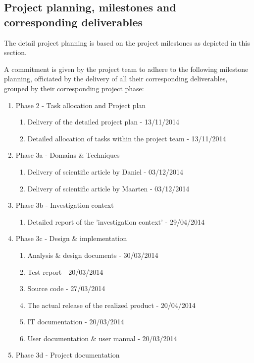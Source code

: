 \subsection{Project planning, milestones and corresponding deliverables }
The detail project planning is based on the project milestones as depicted in this section.


A commitment is given by the project team to adhere to the following milestone planning, officiated by the delivery of all their corresponding deliverables, grouped by their corresponding project phase:

 \begin{enumerate}
	\item Phase 2 - Task allocation and Project plan
 	\begin{enumerate}
		\item Delivery of the detailed project plan 			-	13/11/2014
		\item Detailed allocation of tasks within the project team 	- 	13/11/2014
	\end {enumerate}
	\item Phase 3a - Domains \& Techniques
 	\begin{enumerate}
		\item Delivery of scientific article by Daniel			- 	03/12/2014
		\item Delivery of scientific article by Maarten  			- 	03/12/2014
	\end {enumerate}
 	\item Phase 3b - Investigation context
 	\begin{enumerate}
		\item Detailed report of the 'investigation context'  		- 	29/04/2014
	\end {enumerate}
 	\item Phase 3c - Design \& implementation
 	\begin{enumerate}
		\item Analysis \& design documents  				- 	30/03/2014
		\item Test report  							- 	20/03/2014
		\item Source code  							- 	27/03/2014
		\item The actual release of the realized product  		- 	20/04/2014
		\item IT documentation  						- 	20/03/2014
		\item User documentation \& user manual  			- 	20/03/2014
	\end {enumerate}
 	\item Phase 3d - Project documentation

\end{enumerate}
